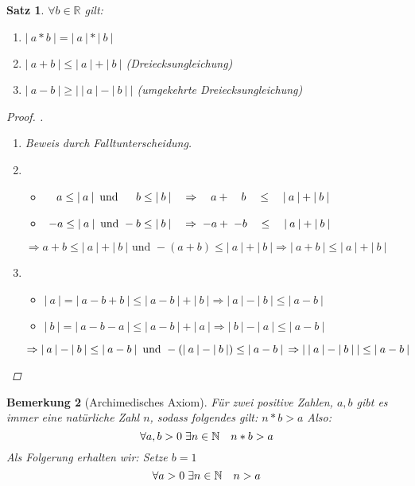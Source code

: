 \documentclass[a4paper,titlepage,oneside]{article}
\def\N{\ensuremath{\mathbb{N}} }
\def\R{\ensuremath{\mathbb{R}} }
\newcommand{\fa}{\ensuremath{\forall}}
\newcommand{\ex}{\ensuremath{\exists}}
\newcommand{\abs}[1]{\ensuremath{\left|\:#1\:\right|}}
\def\sp{\hspace{0,1cm}}
\theoremstyle{thmstyle}
\newtheorem{satz}{Satz}[subsection]
\newtheorem{bem}[satz]{Bemerkung}
\begin{document}
\begin{satz}
\(\fa b \in \R\) gilt:
\begin{enumerate}[label=(\arabic*)]
\item \(\abs{a * b} = \abs{a} * \abs{b}\)
\item \(\abs{a + b} \le \abs{a} + \abs{b}\) (Dreiecksungleichung)
\item \(\abs{a - b} \ge \abs{\abs{a} - \abs{b}}\) (umgekehrte Dreiecksungleichung)
\end{enumerate}
\begin{proof}.
\begin{enumerate}[label=(\arabic*)]
\item Beweis durch Falltunterscheidung.
\item 
\begin{itemize}
\item \(\quad a \le \abs{a} \text{ und } \sp \quad b \le \abs{b} \quad \Rightarrow \quad a + \quad b \quad\le\quad \abs{a}+\abs{b} \) 
\item \(\sp-a \le \abs{a} \text{ und } -b \le \abs{b} \quad \Rightarrow \sp -a + \sp -b \quad\le\quad \abs{a} +\abs{b} \)
\end{itemize}
\(\Rightarrow a + b \le \abs{a} + \abs{b} \text{ und } -(a + b) \le \abs{a} + \abs{b} \Rightarrow \abs{a + b} \le \abs{a} + \abs{b} \)
\item
\begin{itemize}
\item \(\abs{a} = \abs{a - b + b} \le \abs{a - b} + \abs{b} \Rightarrow \abs{a} - \abs{b} \le \abs{a-b}\)
\item \(\abs{b} = \abs{a - b - a} \le \abs{a - b} + \abs{a} \Rightarrow \abs{b} - \abs{a} \le \abs{a-b}\)
\end{itemize}
\(\Rightarrow \abs{a} - \abs{b} \le \abs{a-b} \text{ und } - (\abs{a} - \abs{b}) \le \abs{a-b} \\
\Rightarrow \abs{\abs{a} - \abs{b}} \le \abs{a-b}\)
\end{enumerate}
\end{proof}
\end{satz}

\begin{bem}[Archimedisches Axiom]
Für zwei positive Zahlen, \(a, b\) gibt es immer eine natürliche Zahl $n$, sodass folgendes gilt: \(n * b > a\) Also:
\[\fa a,b > 0 \sp \ex n \in \N \quad n * b > a\]
Als Folgerung erhalten wir: Setze \(b = 1\)
\[\fa a > 0 \sp \ex n \in \N \quad n > a\]
\end{bem}
\end{document}
